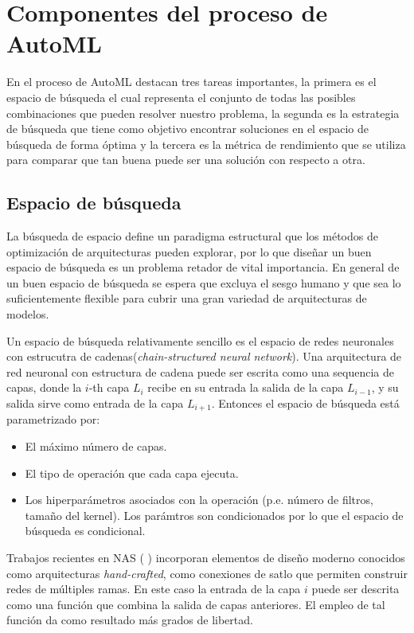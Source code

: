 \section{Componentes del proceso de AutoML}
En el proceso de AutoML destacan tres tareas importantes, la primera es el espacio de búsqueda el cual representa el conjunto de todas las posibles combinaciones que pueden resolver nuestro problema, la segunda es la estrategia de búsqueda que tiene como objetivo encontrar soluciones en el espacio de búsqueda de forma óptima y la tercera es la métrica de rendimiento que se utiliza para comparar que tan buena puede ser una solución con respecto a otra.

\subsection{Espacio de búsqueda}
La búsqueda de espacio define un paradigma estructural que los métodos de optimización de arquitecturas pueden explorar, por lo que diseñar un buen espacio de búsqueda es un problema retador de vital importancia. En general de un buen espacio de búsqueda se espera que excluya el sesgo humano y que sea lo suficientemente flexible para cubrir una gran variedad de arquitecturas de modelos.

Un espacio de búsqueda relativamente sencillo es el espacio de redes neuronales con estrucutra de cadenas(\textit{chain-structured neural network}). Una arquitectura de red neuronal con estructura de cadena puede ser escrita como una sequencia de capas, donde la $i$-th capa $L_i$ recibe en su entrada la salida de la capa $L_{i-1}$, y su salida sirve como entrada de la capa $L_{i + 1}$. Entonces el espacio de búsqueda está parametrizado por:

\begin{itemize}
\item El máximo número de capas.
\item El tipo de operación que cada capa ejecuta.
\item Los hiperparámetros asociados con la operación (p.e. número de filtros, tamaño del kernel). Los parámtros son condicionados por lo que el espacio de búsqueda es condicional.
\end{itemize}

Trabajos recientes en NAS (\parencite{56} \parencite{65} \parencite{66} \parencite{67} \parencite{68}) incorporan elementos de diseño moderno conocidos como arquitecturas \textit{hand-crafted}, como conexiones de satlo que permiten construir redes de múltiples ramas. En este caso la entrada de la capa $i$ puede ser descrita como una función que combina la salida de capas anteriores. El empleo de tal función da como resultado más grados de libertad.\\

